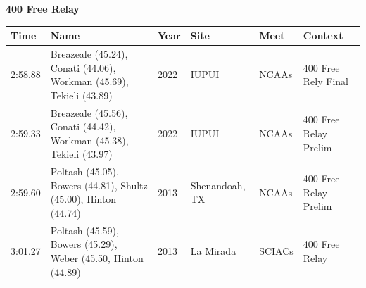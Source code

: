 \vspace{1.2em}
\noindent\begin{minipage}[t]{0.98\textwidth}
\centering
\textbf{\textcolor{teamprimary}{400 Free Relay}}\par
\vspace{0.5em}
\centering
\small
\renewcommand{\arraystretch}{1.0}
\setlength{\tabcolsep}{4pt}
\begin{tabular}{@{}p{2.0cm}p{3.2cm}p{1.2cm}p{2.0cm}p{2.0cm}p{2.5cm}@{}}
\toprule
\textbf{Time} & \textbf{Name} & \textbf{Year} & \textbf{Site} & \textbf{Meet} & \textbf{Context} \\
\midrule
2:58.88 & Breazeale (45.24), Conati (44.06), Workman (45.69), Tekieli (43.89) & 2022 & IUPUI & NCAAs & 400 Free Rely Final \\
2:59.33 & Breazeale (45.56), Conati (44.42), Workman (45.38), Tekieli (43.97) & 2022 & IUPUI & NCAAs & 400 Free Relay Prelim \\
2:59.60 & Poltash (45.05), Bowers (44.81), Shultz (45.00), Hinton (44.74) & 2013 & Shenandoah, TX & NCAAs & 400 Free Relay Prelim \\
3:01.27 & Poltash (45.59), Bowers (45.29), Weber (45.50, Hinton (44.89) & 2013 & La Mirada & SCIACs & 400 Free Relay \\
\bottomrule
\end{tabular}
\end{minipage}
\vspace{1.2em}
